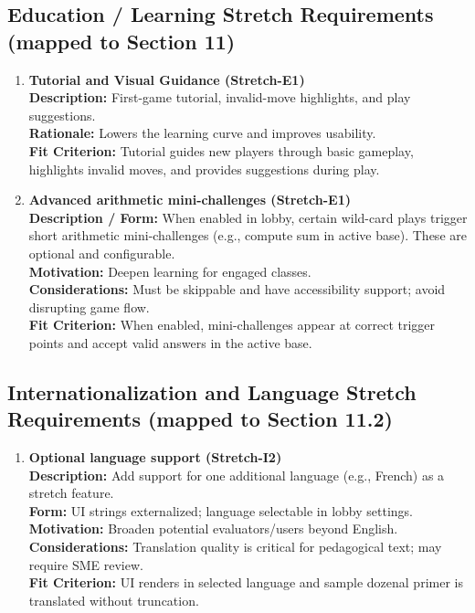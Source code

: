 \documentclass[12pt]{article}
\begin{document}
\subsection{Education / Learning Stretch Requirements (mapped to Section 11)}
\begin{enumerate}
  \item \textbf{Tutorial and Visual Guidance (Stretch-E1)}\\
  \textbf{Description:} First-game tutorial, invalid-move highlights, and play suggestions.\\
  \textbf{Rationale:} Lowers the learning curve and improves usability.\\
  \textbf{Fit Criterion:} Tutorial guides new players through basic gameplay, highlights invalid moves, and provides suggestions during play.
  
  \item \textbf{Advanced arithmetic mini-challenges (Stretch-E1)}\\
  \textbf{Description / Form:} When enabled in lobby, certain wild-card plays trigger short arithmetic mini-challenges (e.g., compute sum in active base). These are optional and configurable.\\
  \textbf{Motivation:} Deepen learning for engaged classes.\\
  \textbf{Considerations:} Must be skippable and have accessibility support; avoid disrupting game flow.\\
  \textbf{Fit Criterion:} When enabled, mini-challenges appear at correct trigger points and accept valid answers in the active base.
\end{enumerate}

\subsection{Internationalization and Language Stretch Requirements (mapped to Section 11.2)}
\begin{enumerate}
  \item \textbf{Optional language support (Stretch-I2)}\\
  \textbf{Description:} Add support for one additional language (e.g., French) as a stretch feature.\\
  \textbf{Form:} UI strings externalized; language selectable in lobby settings.\\
  \textbf{Motivation:} Broaden potential evaluators/users beyond English.\\
  \textbf{Considerations:} Translation quality is critical for pedagogical text; may require SME review.\\
  \textbf{Fit Criterion:} UI renders in selected language and sample dozenal primer is translated without truncation.
\end{enumerate}
\end{document}
